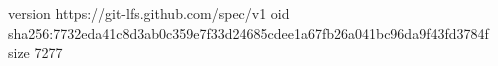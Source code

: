 version https://git-lfs.github.com/spec/v1
oid sha256:7732eda41c8d3ab0c359e7f33d24685cdee1a67fb26a041bc96da9f43fd3784f
size 7277
